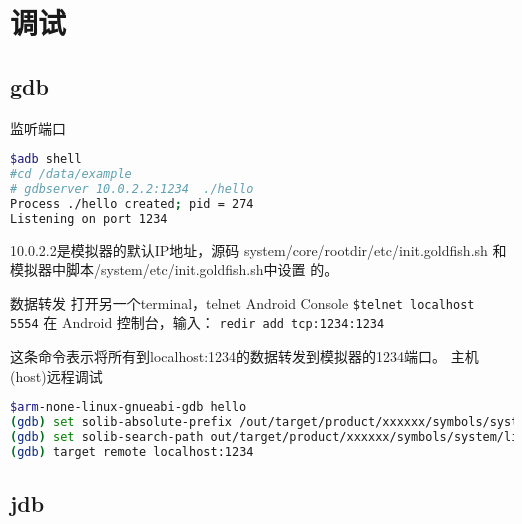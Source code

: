 \documentclass[a4paper,titlepage]{article}
\begin{document}
\section{调试}
\subsection{gdb}
 监听端口
\begin{lstlisting}[language=bash]
$adb shell
#cd /data/example
# gdbserver 10.0.2.2:1234  ./hello     
Process ./hello created; pid = 274 
Listening on port 1234 
\end{lstlisting}

10.0.2.2是模拟器的默认IP地址，源码 system/core/rootdir/etc/init.goldfish.sh  和模拟器中脚本/system/etc/init.goldfish.sh中设置 的。

 数据转发
打开另一个terminal，telnet Android Console
\lstinline{$telnet localhost  5554}
在 Android 控制台，输入：
\lstinline{redir add tcp:1234:1234}

这条命令表示将所有到localhost:1234的数据转发到模拟器的1234端口。
主机(host)远程调试
\begin{lstlisting}[language=bash]
$arm-none-linux-gnueabi-gdb hello
(gdb) set solib-absolute-prefix /out/target/product/xxxxxx/symbols/system/lib/
(gdb) set solib-search-path out/target/product/xxxxxx/symbols/system/lib/
(gdb) target remote localhost:1234
\end{lstlisting}


\subsection{jdb}
\end{document}
